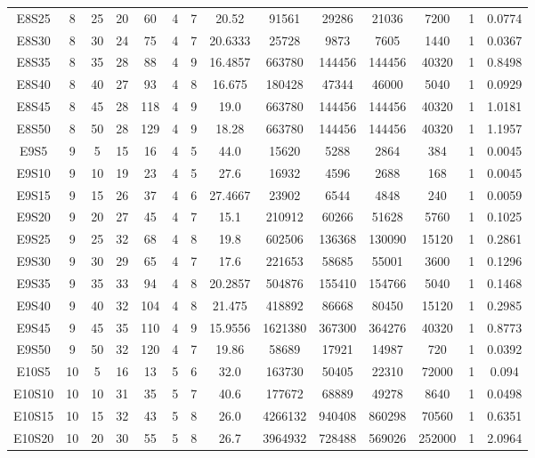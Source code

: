 \documentclass[letter, 10pt]{article}
\begin{document}
\begin{landscape}
\begin{longtable}{|c|c|c|c|c|c|c|c|c|c|c|c|c|c|}
E8S25 & 8 & 25 & 20 & 60 & 4 & 7 & 20.52 & 91561 & 29286 & 21036 & 7200 & 1 & 0.0774 \\
E8S30 & 8 & 30 & 24 & 75 & 4 & 7 & 20.6333 & 25728 & 9873 & 7605 & 1440 & 1 & 0.0367 \\
E8S35 & 8 & 35 & 28 & 88 & 4 & 9 & 16.4857 & 663780 & 144456 & 144456 & 40320 & 1 & 0.8498 \\
E8S40 & 8 & 40 & 27 & 93 & 4 & 8 & 16.675 & 180428 & 47344 & 46000 & 5040 & 1 & 0.0929 \\
E8S45 & 8 & 45 & 28 & 118 & 4 & 9 & 19.0 & 663780 & 144456 & 144456 & 40320 & 1 & 1.0181 \\
E8S50 & 8 & 50 & 28 & 129 & 4 & 9 & 18.28 & 663780 & 144456 & 144456 & 40320 & 1 & 1.1957 \\
E9S5 & 9 & 5 & 15 & 16 & 4 & 5 & 44.0 & 15620 & 5288 & 2864 & 384 & 1 & 0.0045 \\
E9S10 & 9 & 10 & 19 & 23 & 4 & 5 & 27.6 & 16932 & 4596 & 2688 & 168 & 1 & 0.0045 \\
E9S15 & 9 & 15 & 26 & 37 & 4 & 6 & 27.4667 & 23902 & 6544 & 4848 & 240 & 1 & 0.0059 \\
E9S20 & 9 & 20 & 27 & 45 & 4 & 7 & 15.1 & 210912 & 60266 & 51628 & 5760 & 1 & 0.1025 \\
E9S25 & 9 & 25 & 32 & 68 & 4 & 8 & 19.8 & 602506 & 136368 & 130090 & 15120 & 1 & 0.2861 \\
E9S30 & 9 & 30 & 29 & 65 & 4 & 7 & 17.6 & 221653 & 58685 & 55001 & 3600 & 1 & 0.1296 \\
E9S35 & 9 & 35 & 33 & 94 & 4 & 8 & 20.2857 & 504876 & 155410 & 154766 & 5040 & 1 & 0.1468 \\
E9S40 & 9 & 40 & 32 & 104 & 4 & 8 & 21.475 & 418892 & 86668 & 80450 & 15120 & 1 & 0.2985 \\
E9S45 & 9 & 45 & 35 & 110 & 4 & 9 & 15.9556 & 1621380 & 367300 & 364276 & 40320 & 1 & 0.8773 \\
E9S50 & 9 & 50 & 32 & 120 & 4 & 7 & 19.86 & 58689 & 17921 & 14987 & 720 & 1 & 0.0392 \\
E10S5 & 10 & 5 & 16 & 13 & 5 & 6 & 32.0 & 163730 & 50405 & 22310 & 72000 & 1 & 0.094 \\
E10S10 & 10 & 10 & 31 & 35 & 5 & 7 & 40.6 & 177672 & 68889 & 49278 & 8640 & 1 & 0.0498 \\
E10S15 & 10 & 15 & 32 & 43 & 5 & 8 & 26.0 & 4266132 & 940408 & 860298 & 70560 & 1 & 0.6351 \\
E10S20 & 10 & 20 & 30 & 55 & 5 & 8 & 26.7 & 3964932 & 728488 & 569026 & 252000 & 1 & 2.0964 \\

\end{longtable}
\end{landscape}
\end{document}
